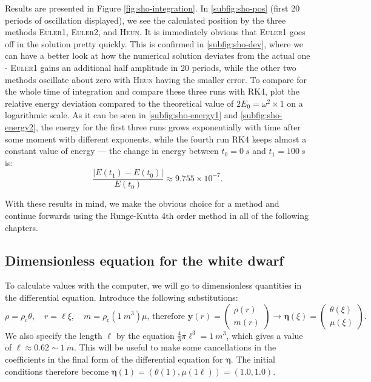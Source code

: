 \documentclass[]{article}
\renewcommand{\vec}[1]{\boldsymbol{#1}}
\newcommand{\rhoCentre}{\rho_\mathrm{c}}
\newcommand{\eulerOne}{\textsc{Euler1}}
\newcommand{\eulerTwo}{\textsc{Euler2}}
\newcommand{\heun}{\textsc{Heun}}
\newcommand{\rkFour}{\textsc{RK4}}
\begin{document}
	Results are presented in Figure \ref{fig:sho-integration}. In \ref{subfig:sho-pos} (first 20 periods of oscillation displayed), we see the calculated position by the three methods \eulerOne{}, \eulerTwo{}, and \heun{}. It is immediately obvious that \eulerOne{} goes off in the solution pretty quickly. This is confirmed in \ref{subfig:sho-dev}, where we can have a better look at how the numerical solution deviates from the actual one - \eulerOne{} gains an additional half amplitude in 20 periods, while the other two methods oscillate about zero with \heun{} having the smaller error. To compare for the whole time of integration and compare these three runs with \rkFour{}, plot the relative energy deviation compared to the theoretical value of $2E_0 = \omega^2 \times 1$ on a logarithmic scale. As it can be seen in \ref{subfig:sho-energy1} and \ref{subfig:sho-energy2}, the energy for the first three runs grows exponentially with time after some moment with different exponents, while the fourth run \rkFour{} keeps almost a constant value of energy --- the change in energy between $t_0=\SI{0}{s}$ and $t_1=\SI{100}{s}$ is:
	\begin{equation}
		\frac{\big| E(t_1) - E(t_0) \big|}{E(t_0)} \approx 9.755 \times 10^{-7}.
	\end{equation}

	With these results in mind, we make the obvious choice for a method and continue forwards using the Runge-Kutta 4th order method in all of the following chapters.


\subsection{Dimensionless equation for the white dwarf}
	To calculate values with the computer, we will go to dimensionless quantities in the differential equation. Introduce the following substitutions:
	\begin{equation}
		\rho = \rhoCentre \theta, \quad r = \ell \xi, \quad m = \rhoCentre (\SI{1}{m^3}) \mu \text{, therefore } \vec{y}(r) = \begin{pmatrix}\rho(r) \\ m(r)\end{pmatrix} \rightarrow \vec{\eta}(\xi) = \begin{pmatrix}\theta(\xi)\\\mu(\xi)\end{pmatrix}.
	\end{equation}
	We also specify the length $\ell$ by the equation $\frac{4}{3}\pi \ell^3 = \SI{1}{m^3}$, which gives a value of $\ell \approx 0.62 \sim \SI{1}{m}$. This will be useful to make some cancellations in the coefficients in the final form of the differential equation for $\vec{\eta}$. The initial conditions therefore become $\vec{\eta}(1) = \left( \theta(1), \mu(1 \ell)\right) = \left(1.0, 1.0 \right)$.
\end{document}
